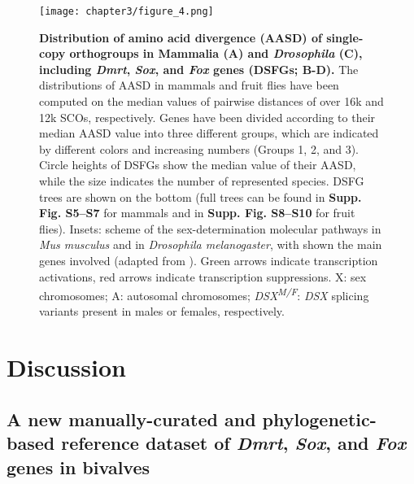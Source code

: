 \documentclass[../main.tex]{subfiles}
\begin{document}
\begin{figure}
    \centering
    \texttt{[image: chapter3/figure\_4.png]}
    \captionsetup{width=\textwidth}
    \caption{
    \textbf{Distribution of amino acid divergence (AASD) of single-copy orthogroups in Mammalia (A) and \textit{Drosophila} (C), including \textit{Dmrt}, \textit{Sox}, and \textit{Fox} genes (DSFGs; B-D).} The distributions of AASD in mammals and fruit flies have been computed on the median values of pairwise distances of over 16k and 12k SCOs, respectively. Genes have been divided according to their median AASD value into three different groups, which are indicated by different colors and increasing numbers (Groups 1, 2, and 3). Circle heights of DSFGs show the median value of their AASD, while the size indicates the number of represented species. DSFG trees are shown on the bottom (full trees can be found in \textbf{Supp. Fig. S5--S7} for mammals and in \textbf{Supp. Fig. S8--S10} for fruit flies). Insets: scheme of the sex-determination molecular pathways in \textit{Mus musculus} and in \textit{Drosophila melanogaster}, with shown the main genes involved (adapted from \textbf{\cite{beukeboom2014evolution}}). Green arrows indicate transcription activations, red arrows indicate transcription suppressions. X: sex chromosomes; A: autosomal chromosomes; \textit{DSX\textsuperscript{M/F}}: \textit{DSX} splicing variants present in males or females, respectively.
    }
    \label{fig:DSFG_testDivergence}
\end{figure}

\section{Discussion} \label{chpater3_discussion}
\subsection{A new manually-curated and phylogenetic-based reference dataset of \textit{Dmrt}, \textit{Sox}, and \textit{Fox} genes in bivalves}
\end{document}
